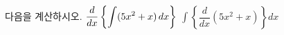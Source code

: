 다음을 계산하시오.
 $\dfrac{d}{dx}\left\{\displaystyle\int (5x^2+x)\mkern3mu dx\right\}$
 $\displaystyle\int \left\{\dfrac{d}{dx}(5x^2+x)\right\}dx$
